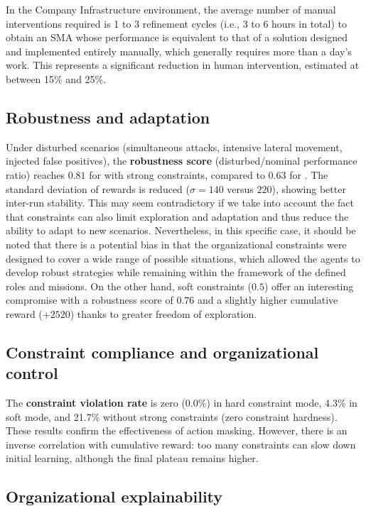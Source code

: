In the Company Infrastructure environment, the average number of manual interventions required is 1 to 3 refinement cycles (i.e., 3 to 6 hours in total) to obtain an SMA whose performance is equivalent to that of a solution designed and implemented entirely manually, which generally requires more than a day's work. This represents a significant reduction in human intervention, estimated at between 15\% and 25\%.

\subsection*{Robustness and adaptation}

Under disturbed scenarios (simultaneous attacks, intensive lateral movement, injected false positives), the \textbf{robustness score} (disturbed/nominal performance ratio) reaches $0.81$ for  with strong constraints, compared to $0.63$ for .
The standard deviation of rewards is reduced ($\sigma = 140$ versus $220$), showing better inter-run stability. This may seem contradictory if we take into account the fact that constraints can also limit exploration and adaptation and thus reduce the ability to adapt to new scenarios. Nevertheless, in this specific case, it should be noted that there is a potential bias in that the organizational constraints were designed to cover a wide range of possible situations, which allowed the agents to develop robust strategies while remaining within the framework of the defined roles and missions.
On the other hand, soft constraints ($0.5$) offer an interesting compromise with a robustness score of $0.76$ and a slightly higher cumulative reward ($+2520$) thanks to greater freedom of exploration.

\subsection*{Constraint compliance and organizational control}

The \textbf{constraint violation rate} is zero (0.0\%) in hard constraint mode, 4.3\% in soft mode, and 21.7\% without strong constraints (zero constraint hardness).
These results confirm the effectiveness of action masking.
However, there is an inverse correlation with cumulative reward: too many constraints can slow down initial learning, although the final plateau remains higher.

\subsection*{Organizational explainability}

